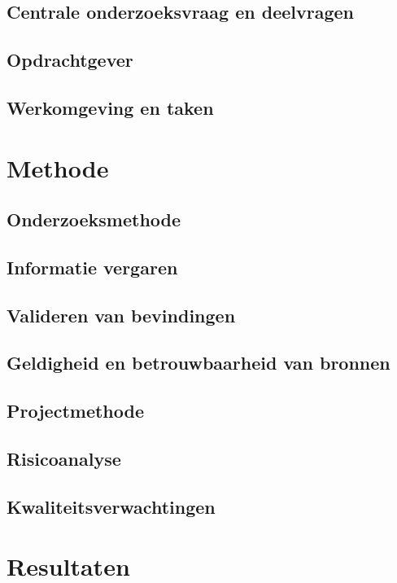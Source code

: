 \documentclass{report}
\begin{document}
\section{Centrale onderzoeksvraag en deelvragen}


\section{Opdrachtgever}

\section{Werkomgeving en taken}


\chapter{Methode}

\section{Onderzoeksmethode}

\section{Informatie vergaren}

\section{Valideren van bevindingen}

\section{Geldigheid en betrouwbaarheid van bronnen}

\section{Projectmethode}

\section{Risicoanalyse}

\section{Kwaliteitsverwachtingen}


\chapter{Resultaten}
\end{document}
